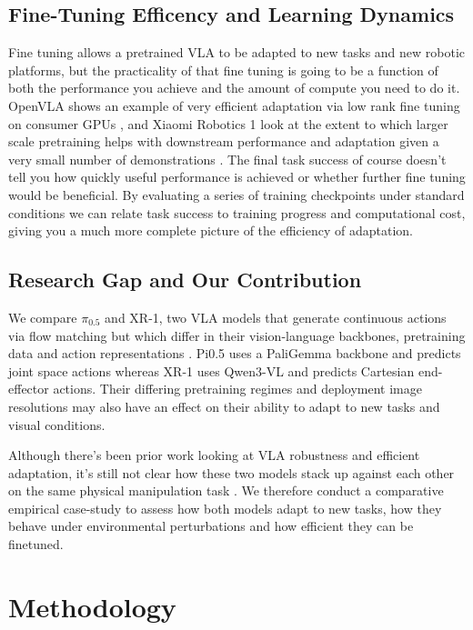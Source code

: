 \documentclass[10pt,twocolumn,letterpaper]{article}
\begin{document}
\subsection{Fine-Tuning Efficency and Learning Dynamics}
Fine tuning allows a pretrained VLA to be adapted to new tasks and new robotic platforms, but the practicality of that fine tuning is going to be a function of both the performance you achieve and the amount of compute you need to do it. OpenVLA shows an example of very efficient adaptation via low rank fine tuning on consumer GPUs \cite{kim2025openvla}, and Xiaomi Robotics 1 look at the extent to which larger scale pretraining helps with downstream performance and adaptation given a very small number of demonstrations \cite{team2026xiaomi}. The final task success of course doesn't tell you how quickly useful performance is achieved or whether further fine tuning would be beneficial. By evaluating a series of training checkpoints under standard conditions we can relate task success to training progress and computational cost, giving you a much more complete picture of the efficiency of adaptation.

\subsection{Research Gap and Our Contribution}
We compare $\pi_{0.5}$ and XR-1, two VLA models that generate continuous actions via flow matching but which differ in their vision-language backbones, pretraining data and action representations \cite{black2025pi05,team2026xiaomi}. Pi0.5 uses a PaliGemma backbone and predicts joint space actions whereas XR-1 uses Qwen3-VL and predicts Cartesian end-effector actions. Their differing pretraining regimes and deployment image resolutions may also have an effect on their ability to adapt to new tasks and visual conditions.

Although there's been prior work looking at VLA robustness and efficient adaptation, it's still not clear how these two models stack up against each other on the same physical manipulation task \cite{fei2026liberoplus,guo2026robustvla}. We therefore conduct a comparative empirical case-study to assess how both models adapt to new tasks, how they behave under environmental perturbations and how efficient they can be finetuned.

\section{Methodology}
\end{document}
